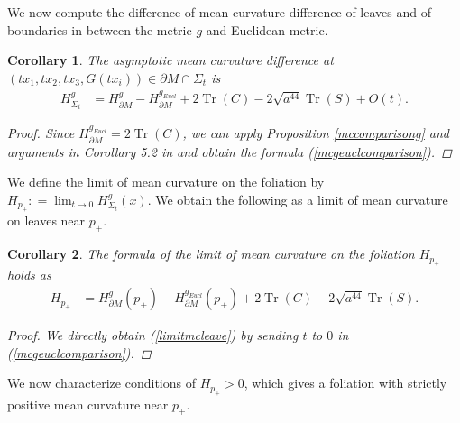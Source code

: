 \documentclass[11pt,letterpaper]{amsart}
\DeclareMathOperator{\Tr}{Tr}
\newtheorem{cor}{Corollary}[section]
\begin{document}
We now compute the difference of mean curvature difference of leaves and of boundaries in between the metric $g$ and Euclidean metric. 
\begin{cor} The asymptotic mean curvature difference at $(tx_1,tx_2,tx_{3}, G(tx_{i})) \in \partial M \cap \Sigma_{t}$ is
\begin{align} \label{mcgeuclcomparison}
    H_{\Sigma_{t}}^{g} &= H^{g}_{\partial M} - H^{g_{Eucl}}_{\partial M} +   2 \Tr(C) -  2 \sqrt{a^{44}} \Tr(S)  +O(t).
\end{align}
\begin{proof}
Since $H_{\partial M}^{g_{Eucl}} = 2 \Tr(C)$, we can apply Proposition \ref{mccomparisong} and arguments in Corollary 5.2 in \cite{koyao} and obtain the formula (\ref{mcgeuclcomparison}).
\end{proof}
\end{cor}
We define the limit of mean curvature on the foliation by $H_{p_{+}} : = \lim_{t \rightarrow 0} H_{\Sigma_{t}}^{g}(x)$.  We obtain the following as a limit of mean curvature on leaves near $p_{+}$.
\begin{cor} \label{limitmcleavecor}
The formula of the limit of mean curvature on the foliation  $H_{p_{+}}$ holds as
\begin{align} \label{limitmcleave}
    H_{p_{+}} &= H^{g}_{\partial M}(p_{+}) - H^{g_{Eucl}}_{\partial M}(p_{+}) +   2 \Tr(C) -  2 \sqrt{a^{44}}\Tr(S).
\end{align}
\begin{proof} We directly obtain (\ref{limitmcleave}) by sending $t$ to $0$ in (\ref{mcgeuclcomparison}). 
\end{proof}
\end{cor}
We now characterize conditions of $H_{p_{+}}>0$, which gives a foliation with strictly positive mean curvature near $p_{+}$.
\end{document}
